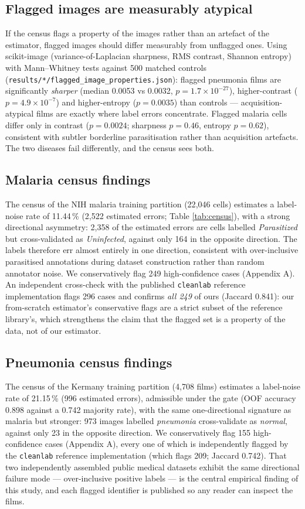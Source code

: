 \documentclass[11pt]{article}
\theoremstyle{definition}
\begin{document}
\subsection{Flagged images are measurably atypical}
If the census flags a property of the images rather than an artefact of
the estimator, flagged images should differ measurably from unflagged
ones. Using scikit-image (variance-of-Laplacian sharpness, RMS contrast,
Shannon entropy) with Mann--Whitney tests against 500 matched controls
(\texttt{results/*/flagged\_image\_properties.json}): flagged pneumonia
films are significantly \emph{sharper} (median 0.0053 vs 0.0032,
$p{=}1.7{\times}10^{-27}$), higher-contrast ($p{=}4.9{\times}10^{-7}$)
and higher-entropy ($p{=}0.0035$) than controls --- acquisition-atypical
films are exactly where label errors concentrate. Flagged malaria cells
differ only in contrast ($p{=}0.0024$; sharpness $p{=}0.46$, entropy
$p{=}0.62$), consistent with subtler borderline parasitisation rather
than acquisition artefacts. The two diseases fail differently, and the
census sees both.
\subsection{Malaria census findings}
The census of the NIH malaria training partition (22{,}046 cells) estimates
a label-noise rate of 11.44\,\% (2{,}522 estimated errors; Table
\ref{tab:census}), with a strong directional asymmetry: 2{,}358 of the
estimated errors are cells labelled \emph{Parasitized} but cross-validated
as \emph{Uninfected}, against only 164 in the opposite direction. The
labels therefore err almost entirely in one direction, consistent with
over-inclusive parasitised annotations during dataset construction rather
than random annotator noise. We conservatively flag 249 high-confidence
cases (Appendix A). An independent cross-check with the published
\texttt{cleanlab} reference implementation flags 296 cases and confirms
\emph{all 249} of ours (Jaccard 0.841): our from-scratch estimator's
conservative flags are a strict subset of the reference library's, which
strengthens the claim that the flagged set is a property of the data, not
of our estimator.
\subsection{Pneumonia census findings}
The census of the Kermany training partition (4{,}708 films) estimates a
label-noise rate of 21.15\,\% (996 estimated errors), admissible under
the gate (OOF accuracy 0.898 against a 0.742 majority rate), with the
same one-directional signature as malaria but stronger: 973 images
labelled \emph{pneumonia} cross-validate as \emph{normal}, against only
23 in the opposite direction. We conservatively flag 155 high-confidence
cases (Appendix A), every one of which is independently flagged by the
\texttt{cleanlab} reference implementation (which flags 209; Jaccard
0.742). That two independently assembled public medical datasets exhibit
the same directional failure mode --- over-inclusive positive labels ---
is the central empirical finding of this study, and each flagged
identifier is published so any reader can inspect the films.
\end{document}
